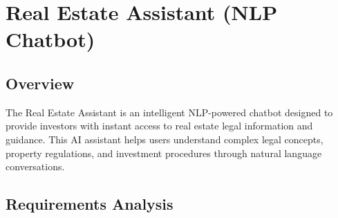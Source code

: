 
\newpage

\section{Real Estate Assistant (NLP Chatbot)}
\subsection{Overview}
The Real Estate Assistant is an intelligent NLP-powered chatbot designed to provide investors with instant access to real estate legal information and guidance. This AI assistant helps users understand complex legal concepts, property regulations, and investment procedures through natural language conversations.

\subsection{Requirements Analysis}
